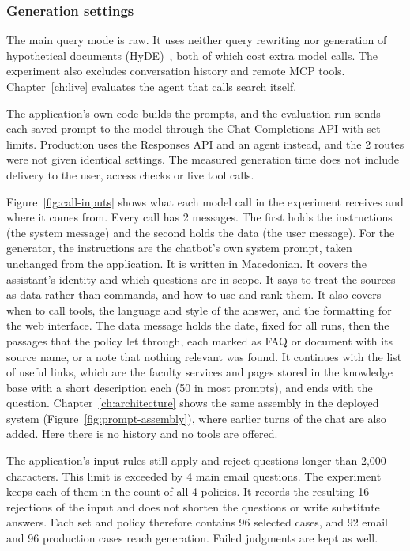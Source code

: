 \subsubsection{Generation settings}

The main query mode is raw. It uses neither query rewriting nor generation of hypothetical documents (HyDE)~\cite{gao2023hyde}, both of which cost extra model calls. The experiment also excludes conversation history and remote MCP tools. Chapter~\ref{ch:live} evaluates the agent that calls search itself.

The application's own code builds the prompts, and the evaluation run sends each saved prompt to the model through the Chat Completions API with set limits. Production uses the Responses API and an agent instead, and the 2 routes were not given identical settings. The measured generation time does not include delivery to the user, access checks or live tool calls.

Figure~\ref{fig:call-inputs} shows what each model call in the experiment receives and where it comes from. Every call has 2 messages. The first holds the instructions (the system message) and the second holds the data (the user message). For the generator, the instructions are the chatbot's own system prompt, taken unchanged from the application. It is written in Macedonian. It covers the assistant's identity and which questions are in scope. It says to treat the sources as data rather than commands, and how to use and rank them. It also covers when to call tools, the language and style of the answer, and the formatting for the web interface. The data message holds the date, fixed for all runs, then the passages that the policy let through, each marked as FAQ or document with its source name, or a note that nothing relevant was found. It continues with the list of useful links, which are the faculty services and pages stored in the knowledge base with a short description each (50 in most prompts), and ends with the question. Chapter~\ref{ch:architecture} shows the same assembly in the deployed system (Figure~\ref{fig:prompt-assembly}), where earlier turns of the chat are also added. Here there is no history and no tools are offered.



The application's input rules still apply and reject questions longer than 2,000 characters. This limit is exceeded by 4 main email questions. The experiment keeps each of them in the count of all 4 policies. It records the resulting 16 rejections of the input and does not shorten the questions or write substitute answers. Each set and policy therefore contains 96 selected cases, and 92 email and 96 production cases reach generation. Failed judgments are kept as well.

